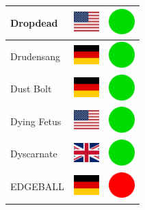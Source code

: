 \documentclass[12pt, a4paper, twoside]{report}
\begin{document}
\begin{center}
\begin{longtable}{|p{5cm}|p{2cm}|p{2cm}|}
 Dropdead                                                   & \includegraphics[width=1cm]{../4x3/us} &   \includegraphics[width=1cm]{../likes/y} \\ \hline
 Drudensang                                                 & \includegraphics[width=1cm]{../4x3/de} &   \includegraphics[width=1cm]{../likes/y} \\ \hline
 Dust Bolt                                                  & \includegraphics[width=1cm]{../4x3/de} &   \includegraphics[width=1cm]{../likes/y} \\ \hline
 Dying Fetus                                                & \includegraphics[width=1cm]{../4x3/us} &   \includegraphics[width=1cm]{../likes/y} \\ \hline
 Dyscarnate                                                 & \includegraphics[width=1cm]{../4x3/gb} &   \includegraphics[width=1cm]{../likes/y} \\ \hline
 EDGEBALL                                                   & \includegraphics[width=1cm]{../4x3/de} &   \includegraphics[width=1cm]{../likes/n} \\ \hline

\end{longtable}
\end{center}
\end{document}
